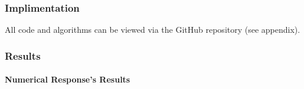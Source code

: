 \documentclass[
  12pt,
]{article}
\begin{document}
\hypertarget{implimentation}{%
\subsubsection{Implimentation}\label{implimentation}}

All code and algorithms can be viewed via the GitHub repository (see
appendix).

\hypertarget{results}{%
\subsubsection{Results}\label{results}}

\hypertarget{numerical-responses-results}{%
\paragraph{Numerical Response's
Results}\label{numerical-responses-results}}
\end{document}
